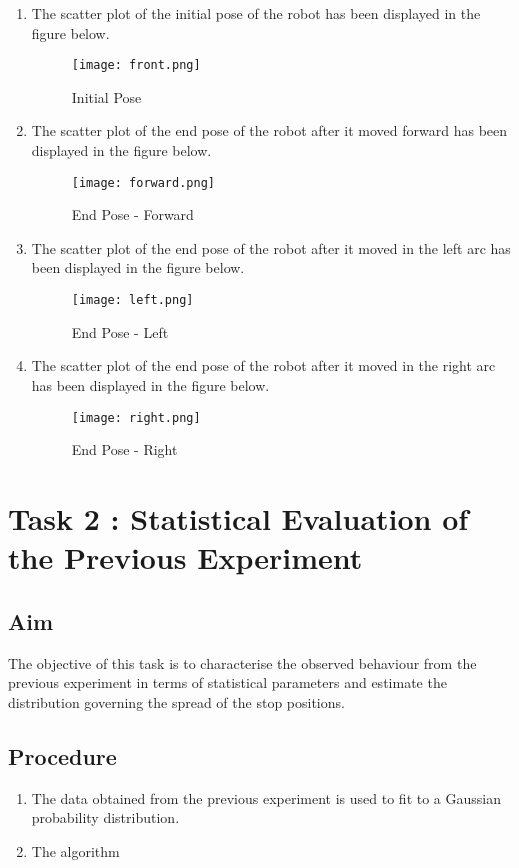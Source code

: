 \documentclass[10pt,a4paper]{article}
\begin{document}
\begin{enumerate}
	\item
	The scatter plot of the initial pose of the robot has been displayed in the figure below.

\begin{figure}[H]
	\centering
	\texttt{[image: front.png]}
	\caption{Initial Pose}
\end{figure}

\newpage
\item
The scatter plot of the end pose of the robot after it moved forward has been displayed in the figure below.

\begin{figure}[H]
	\centering
	\texttt{[image: forward.png]}
	\caption{End Pose - Forward}
\end{figure}

\newpage
\item
The scatter plot of the end pose of the robot after it moved in the left arc has been displayed in the figure below.

\begin{figure}[H]
	\centering
	\texttt{[image: left.png]}
	\caption{End Pose - Left}
\end{figure}


\newpage
\item
The scatter plot of the end pose of the robot after it moved in the right arc has been displayed in the figure below.

\begin{figure}[H]
	\centering
	\texttt{[image: right.png]}
	\caption{End Pose - Right}
\end{figure}

\end{enumerate}

\newpage

\section{Task 2 : Statistical Evaluation of the Previous Experiment}

\subsection{Aim}
\Large
The objective of this task is to characterise the observed behaviour from the previous experiment in terms of statistical parameters and estimate the distribution governing the spread of the stop positions.


\subsection{Procedure}

\begin{enumerate}
	\item
	The data obtained from the previous experiment is used to fit to a Gaussian probability distribution. 
	\item
	The algorithm 
\end{enumerate}
		
		
\end{document}
